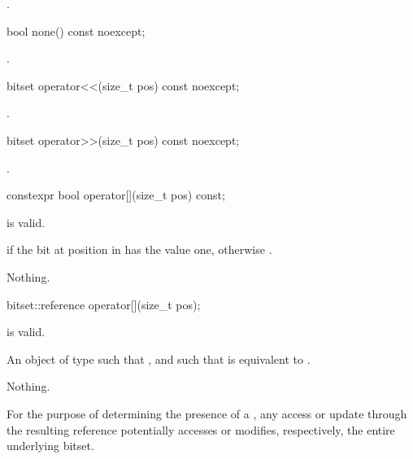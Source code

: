 \begin{itemdescr}
\pnum
\returns
{}.
\end{itemdescr}

%
\begin{itemdecl}
bool none() const noexcept;
\end{itemdecl}

\begin{itemdescr}
\pnum
\returns
{}.
\end{itemdescr}

%
\begin{itemdecl}
bitset operator<<(size_t pos) const noexcept;
\end{itemdecl}

\begin{itemdescr}
\pnum
\returns
{}.
\end{itemdescr}

%
\begin{itemdecl}
bitset operator>>(size_t pos) const noexcept;
\end{itemdecl}

\begin{itemdescr}
\pnum
\returns
{}.
\end{itemdescr}

%
\begin{itemdecl}
constexpr bool operator[](size_t pos) const;
\end{itemdecl}

\begin{itemdescr}
\pnum
\expects
{} is valid.

\pnum
\returns
{} if the bit at position  in  has the value
one, otherwise .

\pnum
\throws
Nothing.
\end{itemdescr}

%
\begin{itemdecl}
bitset::reference operator[](size_t pos);
\end{itemdecl}

\begin{itemdescr}
\pnum
\expects
{} is valid.

\pnum
\returns
An object of type
such that
,
and such that
is equivalent to
.

\pnum
\throws
Nothing.

\pnum
\remarks
For the purpose of determining the presence of a
, any access or update through the resulting
reference potentially accesses or modifies, respectively, the entire
underlying bitset.
\end{itemdescr}

